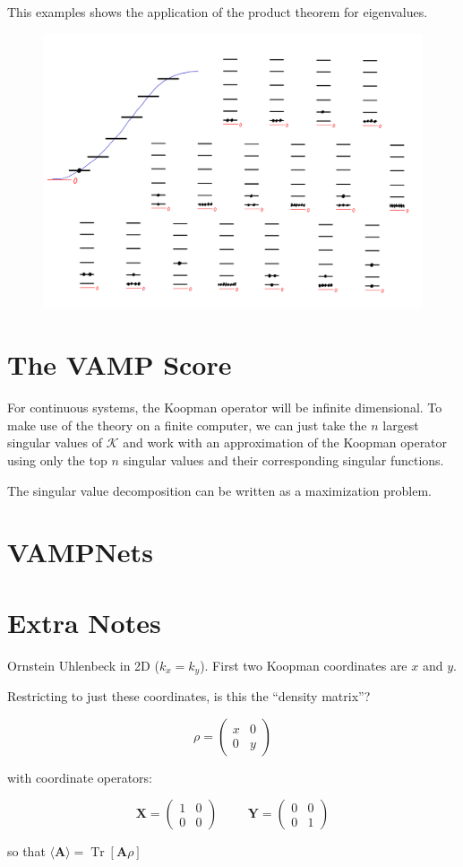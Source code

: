 \documentclass[]{article}
\newcommand{\bk}[1]{\left[ #1 \right]}
\newcommand{\w}[1]{\mathbf{#1}}
\newcommand{\Kp}{\mathcal{K}}
\DeclareMathOperator\Tr{Tr}
\begin{document}
This examples shows the application of the product theorem for eigenvalues.

\begin{figure}[h!]
	\includegraphics[width=\textwidth]{polymer_levels.png}
\end{figure}

\section{The VAMP Score}

For continuous systems, the Koopman operator will be infinite dimensional. To make use of the theory on a finite computer, we can just take the $n$ largest singular values of $\Kp$ and work with an approximation of the Koopman operator using only the top $n$ singular values and their corresponding singular functions.

The singular value decomposition can be written as a maximization problem.


\section{VAMPNets}
\section{Extra Notes}

Ornstein Uhlenbeck in 2D ($k_x=k_y$). First two Koopman coordinates are $x$ and $y$.

Restricting to just these coordinates, is this the ``density matrix''?

$$
\rho=\begin{pmatrix}
	x & 0 \\
	0 & y
\end{pmatrix}
$$

with coordinate operators:

$$
\w{X} = \begin{pmatrix}
	1 & 0 \\
	0 & 0
\end{pmatrix}
\hspace{1cm}
\w{Y} = \begin{pmatrix}
	0 & 0 \\
	0 & 1
\end{pmatrix}
$$

so that $\langle \w{A} \rangle = \Tr\bk{\w{A}\rho}$
\end{document}

